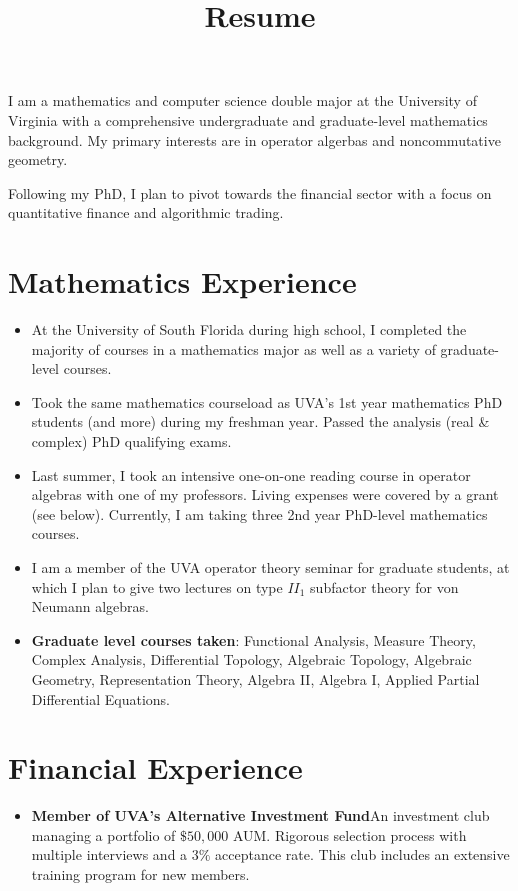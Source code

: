 \documentclass[12pt,letterpaper,sans]{moderncv}
\title{Resume}
\begin{document}
\makecvtitle %
\vspace*{-1.5em}


\begin{center}
  I am a mathematics and computer science double major at the University of Virginia with a comprehensive undergraduate and graduate-level mathematics background. My primary interests are in operator algerbas and noncommutative geometry.

\vspace{1.0em}
  Following my PhD, I plan to pivot towards the financial sector with a focus on quantitative finance and algorithmic trading.
\end{center}

\section{Mathematics Experience}

\begin{itemize}
  \item At the University of South Florida during high school, I completed the majority of courses in a mathematics major as well as a variety of graduate-level courses.
  \item Took the same mathematics courseload as UVA's 1st year mathematics PhD students (and more) during my freshman year. Passed the analysis (real \& complex) PhD qualifying exams.
  \item Last summer, I took an intensive one-on-one reading course in operator algebras with one of my professors. Living expenses were covered by a grant (see below). Currently, I am taking three 2nd year PhD-level mathematics courses. 
  \item I am a member of the UVA operator theory seminar for graduate students, at which I plan to give two lectures on type $ II_1 $ subfactor theory for von Neumann algebras.
  \item \textbf{Graduate level courses taken}: Functional Analysis, Measure Theory, Complex Analysis, Differential Topology, Algebraic Topology, Algebraic Geometry, Representation Theory, Algebra II, Algebra I, Applied Partial Differential Equations.
\end{itemize}

\section{Financial Experience}
\begin{itemize}
  \item \textbf{Member of UVA's Alternative Investment Fund}\quad An investment club managing a portfolio of $ \$50,000 $ AUM. Rigorous selection process with multiple interviews and a $ 3\% $ acceptance rate. This club includes an extensive training program for new members. 
\end{itemize}
\end{document}
